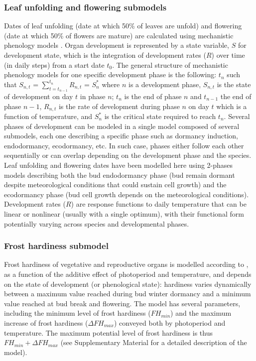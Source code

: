 \documentclass[preprint,12pt,authoryear]{elsarticle}
\begin{document}
\subsubsection{Leaf unfolding and flowering submodels}

Dates of leaf unfolding (date at which 50\% of leaves are unfold) and flowering (date at which 50\% of flowers are mature) are calculated using mechanistic phenology models \citep{Chuine2017}. Organ development is represented by a state variable, $S$ for development state, which is the integration of development rates ($R$) over time (in daily steps) from a start date $t_0$. The general structure of mechanistic phenology models for one specific development phase is the following:
$t_n$ such that $S_{n,t}$ = $\sum_{t=t_{n-1}}^{t_n} R_{n,t}$ = $S_n^*$ 
where $n$ is a development phase, $S_{n,t}$ is the state of development on day $t$ in phase $n$; $t_n$ is the end of phase $n$ and  $t_{n-1}$ the end of phase ${n-1}$, $R_{n,t}$ is the rate of development during phase $n$ on day $t$ which is a function of  temperature, and $S_n^*$ is the critical state required to reach $t_n$.  Several phases of development can be modeled in a single model composed of several submodels, each one describing a specific phase such as dormancy induction, endodormancy, ecodormancy, etc. In such case, phases either follow each other sequentially or can overlap depending on the development phase and the species. Leaf unfolding and flowering dates have been modelled here using 2-phases models describing both the bud endodormancy phase (bud remain dormant despite meteorological conditions that could sustain cell growth) and the ecodormancy phase (bud cell growth depends on the meteorological conditions).  Development rates ($R$) are response functions to daily temperature that can be linear or nonlinear (usually with a single optimum), with their functional form potentially varying across species and developmental phases. 

\subsubsection{Frost hardiness submodel}

Frost hardiness of vegetative and reproductive organs is modelled according to \citet{Leinonen1996}, as a function of the additive effect of photoperiod and temperature, and depends on the state of development (or phenological state): hardiness varies dynamically between a maximum value reached during bud winter dormancy and a minimum value reached at bud break and flowering. The model has several parameters, including the minimum level of frost hardiness ($FH_{min}$) and the maximum increase of frost hardiness ($\Delta FH_{max}$) conveyed both by photoperiod and temperature. The maximum potential level of frost hardiness is thus $FH_{min}+\Delta FH_{max}$ (see Supplementary Material for a detailed description of the model). 
\end{document}

